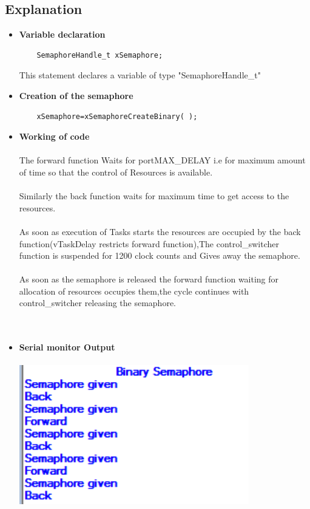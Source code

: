 \documentclass[11pt,a4paper]{book}
\begin{document}
\subsection{Explanation}
	\begin{itemize}
	\item \textbf{Variable declaration}	
	
	\begin{lstlisting}
	SemaphoreHandle_t xSemaphore;
	\end{lstlisting}
	
	 This statement declares a variable of type "SemaphoreHandle\_t"
	
	\item \textbf{Creation of the semaphore}
	
	\begin{lstlisting}
	xSemaphore=xSemaphoreCreateBinary( );
	\end{lstlisting}

\item \textbf{Working of code}
	  \\
	  \\
	  The forward function Waits for portMAX\_DELAY i.e for maximum amount of time so that the control of Resources is available.
	  \\
	  \\
	  Similarly the back function waits for maximum time to get access to the resources.
	  \\
	  \\	
	  As soon as execution of Tasks starts the resources are occupied by the back function(vTaskDelay restricts forward function),The control\_switcher function is suspended for 1200 clock counts and Gives away the semaphore.
	  \\
	  \\
	  As soon as the semaphore is released the forward function waiting for allocation of resources occupies them,the cycle continues with control\_switcher releasing the semaphore.  
		\\
		\\
		\\
\item \textbf{Serial monitor Output} 
\\
\\
\includegraphics[width=10cm]{bin}

\end{itemize}
\newpage 
\end{document}
